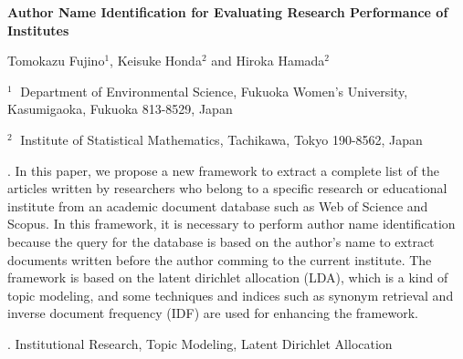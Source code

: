 \documentclass[12pt]{article}
\begin{document}
\begin{flushleft}


{\LARGE\bf Author Name Identification for Evaluating Research Performance of Institutes}


\vspace{1.0cm}

Tomokazu Fujino$^1$, Keisuke Honda$^2$ and Hiroka Hamada$^2$

\begin{description}

\item $^1 \;$ Department of Environmental Science, Fukuoka Women's University,
Kasumigaoka, Fukuoka 813-8529, Japan

\item $^2 \;$ Institute of Statistical Mathematics,
Tachikawa, Tokyo 190-8562, Japan

\end{description}

\end{flushleft}


\vspace{0.75cm}

. In this paper, we propose a new framework to extract a complete list of the articles written by researchers who belong to a specific research or educational institute from an academic document database such as Web of Science and Scopus. In this framework, it is necessary to perform author name identification because the query for the database is based on the author's name to extract documents written before the author comming to the current institute. The framework is based on the latent dirichlet allocation (LDA), which is a kind of topic modeling, and some techniques and indices such as synonym retrieval and inverse document frequency (IDF) are used for enhancing the framework.


\vskip 2mm

.
Institutional Research, Topic Modeling, Latent Dirichlet Allocation
\end{document}
